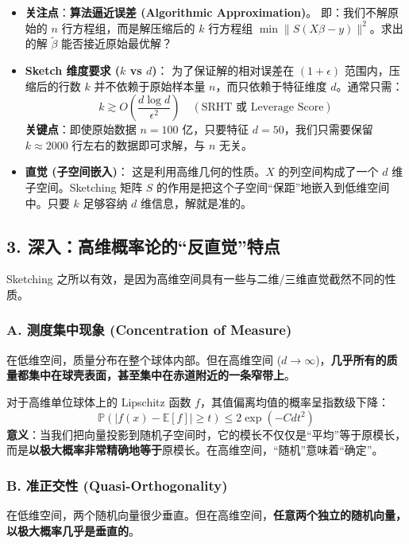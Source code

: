 \documentclass[11pt,a4paper]{ctexart}
\theoremstyle{definition}
\theoremstyle{remark}
\begin{document}
\begin{itemize}
    \item \textbf{关注点}：\textbf{算法逼近误差 (Algorithmic Approximation)}。
    即：我们不解原始的 $n$ 行方程组，而是解压缩后的 $k$ 行方程组 $\min \|S(X\beta - y)\|^2$。求出的解 $\tilde{\beta}$ 能否接近原始最优解？
    
    \item \textbf{Sketch 维度要求 ($k$ vs $d$)}：
    为了保证解的相对误差在 $(1+\epsilon)$ 范围内，压缩后的行数 $k$ 并不依赖于原始样本量 $n$，而只依赖于特征维度 $d$。通常只需：
    \[
    k \gtrsim O\left(\frac{d \log d}{\epsilon^2}\right) \quad (\text{SRHT 或 Leverage Score})
    \]
    \textbf{关键点}：即使原始数据 $n = 100$ 亿，只要特征 $d=50$，我们只需要保留 $k \approx 2000$ 行左右的数据即可求解，与 $n$ 无关。
    
    \item \textbf{直觉 (子空间嵌入)}：
    这是利用高维几何的性质。$X$ 的列空间构成了一个 $d$ 维子空间。Sketching 矩阵 $S$ 的作用是把这个子空间“保距”地嵌入到低维空间中。只要 $k$ 足够容纳 $d$ 维信息，解就是准的。
\end{itemize}

\subsection{3. 深入：高维概率论的“反直觉”特点}
Sketching 之所以有效，是因为高维空间具有一些与二维/三维直觉截然不同的性质。

\subsubsection{A. 测度集中现象 (Concentration of Measure)}
在低维空间，质量分布在整个球体内部。但在高维空间 ($d \to \infty$)，\textbf{几乎所有的质量都集中在球壳表面，甚至集中在赤道附近的一条窄带上}。

对于高维单位球体上的 Lipschitz 函数 $f$，其值偏离均值的概率呈指数级下降：
\[
\mathbb{P}(|f(x) - \mathbb{E}[f]| \geq t) \leq 2 \exp(-C d t^2)
\]
\textbf{意义}：当我们把向量投影到随机子空间时，它的模长不仅仅是“平均”等于原模长，而是\textbf{以极大概率非常精确地等于}原模长。在高维空间，“随机”意味着“确定”。

\subsubsection{B. 准正交性 (Quasi-Orthogonality)}
在低维空间，两个随机向量很少垂直。但在高维空间，\textbf{任意两个独立的随机向量，以极大概率几乎是垂直的}。
\end{document}
